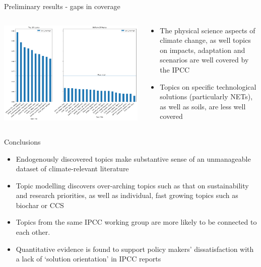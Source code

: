 \documentclass[9pt]{beamer}
\begin{document}
\begin{frame}{Preliminary results - gaps in coverage}

\begin{columns}
	\begin{column}{0.7\linewidth}
		\begin{center}
			\includegraphics[width=\linewidth]{../plots/ipcc_topics_386.png}
		\end{center}
	\end{column}
	\begin{column}{0.3\linewidth}
		\begin{center}
			\begin{itemize}
				\item The physical science aspects of climate change, as well topics on impacts, adaptation and scenarios are well covered by the IPCC
				\item Topics on specific technological solutions (particularly NETs), as well as soils, are less well covered
			\end{itemize}
		\end{center}
	\end{column}
\end{columns}

\end{frame}

\begin{frame}{Conclusions}


\begin{itemize}
	\item Endogenously discovered topics make substantive sense of an unmanageable dataset of climate-relevant literature
	\item Topic modelling discovers over-arching topics such as that on sustainability and research priorities, as well as individual, fast growing topics such as biochar or CCS
	\item Topics from the same IPCC working group are more likely to be connected to each other.
	\item Quantitative evidence is found to support policy makers' dissatisfaction with a lack of `solution orientation' in IPCC reports \citep{Kowarsch2017} 
\end{itemize}

\end{frame}
\end{document}
